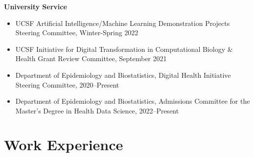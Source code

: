 \documentclass[11pt,a4paper,sans]{moderncv}        %
\begin{document}
\textbf{University Service}
\begin{itemize}
    \item UCSF Artificial Intelligence/Machine Learning Demonstration Projects Steering Committee, Winter-Spring 2022
	\item UCSF Initiative for Digital Transformation in Computational Biology \& Health Grant Review Committee, September 2021
	\item Department of Epidemiology and Biostatistics, Digital Health Initiative Steering Committee, 2020--Present
	\item Department of Epidemiology and Biostatistics, Admissions Committee for the Master's Degree in Health Data Science, 2022--Present
\end{itemize}

\section{Work Experience}
\end{document}
